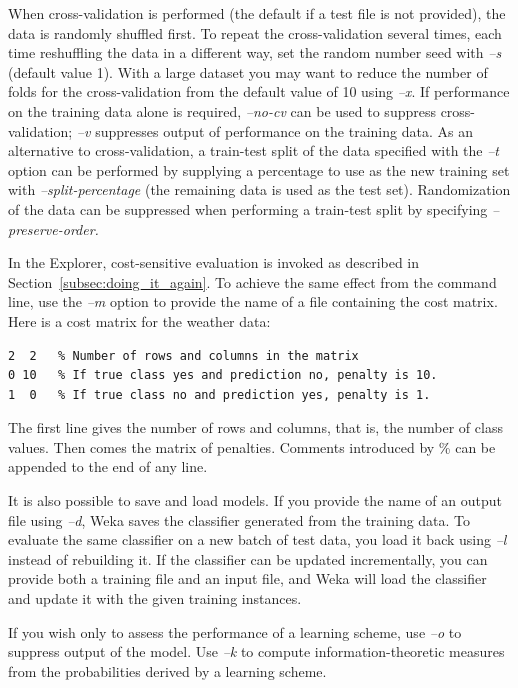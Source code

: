 When cross-validation is performed (the default if a test file is not
provided), the data is randomly shuffled first. To repeat the
cross-validation several times, each time reshuffling the data in a
different way, set the random number seed with \textit{--s} (default
value 1). With a large dataset you may want to reduce the number of
folds for the cross-validation from the default value of 10
using \textit{--x}. If performance on the training data alone is
required, \textit{--no-cv} can be used to suppress
cross-validation; \textit{--v} suppresses output of performance on the
training data. As an alternative to cross-validation, a train-test
split of the data specified with the \textit{--t} option can be
performed by supplying a percentage to use as the new training set
with \textit{--split-percentage} (the remaining data is used as the test
set). Randomization of the data can be suppressed when performing a
train-test split by specifying \textit{--preserve-order.}

In the Explorer, cost-sensitive evaluation is invoked as described in
Section~\ref{subsec:doing_it_again}. To achieve the same effect from
the command line, use the \textit{--m} option to provide the name of a
file containing the cost matrix. Here is a cost matrix for the weather
data: \newline

\begin{Verbatim}[fontsize=\footnotesize]
2  2   % Number of rows and columns in the matrix
0 10   % If true class yes and prediction no, penalty is 10.
1  0   % If true class no and prediction yes, penalty is 1.
\end{Verbatim}

\noindent The first line gives the number of rows and columns, that is, 
the number of class values. Then comes the matrix of
penalties. Comments introduced by \% can be appended to the end of any
line.

It is also possible to save and load models. If you provide the name
of an output file using \textit{--d}, Weka saves the classifier
generated from the training data. To evaluate the same classifier on a
new batch of test data, you load it back using \textit{--l} instead of
rebuilding it. If the classifier can be updated incrementally, you can
provide both a training file and an input file, and Weka will load the
classifier and update it with the given training instances.

If you wish only to assess the performance of a learning scheme, use
\textit{--o} to suppress output of the model. Use \textit{--k} to compute
information-theoretic measures from the probabilities derived by a
learning scheme.

